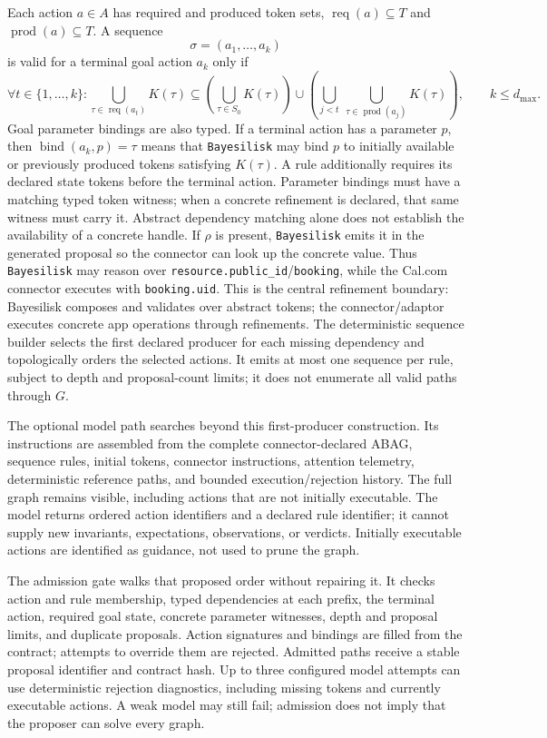 \documentclass[10pt]{article}
\newcommand{\tool}{\texttt{Bayesilisk}\xspace}
\begin{document}
Each action \(a\in A\) has required and produced token sets,
\(\operatorname{req}(a)\subseteq T\) and
\(\operatorname{prod}(a)\subseteq T\). A sequence
\[
  \sigma = (a_1,\ldots,a_k)
\]
is valid for a terminal goal action \(a_k\) only if
\[
  \forall t \in \{1,\ldots,k\}:
  \bigcup_{\tau\in\operatorname{req}(a_t)} K(\tau)
  \subseteq
  \left(\bigcup_{\tau\in S_0}K(\tau)\right)\cup
  \left(\bigcup_{j<t}\ \bigcup_{\tau\in\operatorname{prod}(a_j)} K(\tau)\right),
  \qquad k \le d_{\max}.
\]
Goal parameter bindings are also typed. If a terminal action has a parameter
\(p\), then \(\operatorname{bind}(a_k,p)=\tau\) means that \tool may bind
\(p\) to initially available or previously produced tokens satisfying \(K(\tau)\).
A rule additionally requires its declared state tokens before the terminal
action. Parameter bindings must have a matching typed token witness; when a
concrete refinement is declared, that same witness must carry it. Abstract
dependency matching alone does not establish the availability of a concrete handle.
If \(\rho\) is present, \tool emits it in the generated proposal so the
connector can look up the concrete value. Thus \tool may reason over
\texttt{resource.public\_id}/\texttt{booking}, while the Cal.com connector
executes with \texttt{booking.uid}. This is the central refinement boundary:
Bayesilisk composes and validates over abstract tokens; the connector/adaptor
executes concrete app operations through refinements. The deterministic sequence
builder selects the first declared producer for each missing dependency and
topologically orders the selected actions. It emits at most one sequence per
rule, subject to depth and proposal-count limits; it does not enumerate all
valid paths through \(G\).

The optional model path searches beyond this first-producer construction. Its
instructions are assembled from the complete connector-declared ABAG, sequence
rules, initial tokens, connector instructions, attention telemetry, deterministic
reference paths, and bounded execution/rejection history. The full graph remains
visible, including actions that are not initially executable. The model returns
ordered action identifiers and a declared rule identifier; it cannot supply new
invariants, expectations, observations, or verdicts. Initially executable actions
are identified as guidance, not used to prune the graph.

The admission gate walks that proposed order without repairing it. It checks
action and rule membership, typed dependencies at each prefix, the terminal
action, required goal state, concrete parameter witnesses, depth and proposal
limits, and duplicate proposals. Action signatures and bindings are filled from
the contract; attempts to override them are rejected. Admitted paths receive a
stable proposal identifier and contract hash. Up to three configured model
attempts can use deterministic rejection diagnostics, including missing tokens
and currently executable actions. A weak model may still fail; admission does
not imply that the proposer can solve every graph.
\end{document}
